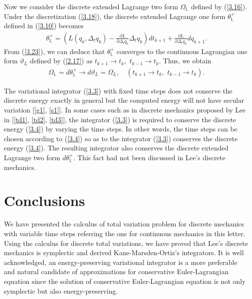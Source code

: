 \documentclass[a4paper,a4paper]{article}
\def\sect#1{\section{#1}\setcounter{equation}{0}}
\begin{document}
Now we consider the discrete extended Lagrange two form
$\Omega_{\mathbb{L}}$ defined by (\ref{3.16}). Under the
discretization (\ref{3.18}), the discrete extended Lagrange one
form $\theta_{\mathbb{L}}^{+}$ defined in (\ref{3.10}) becomes
\begin{align}
\theta_{\mathbb{L}}^{+}=\left(L(q_{k}, \Delta_{t}q_{k})
-\frac{\partial L}{\partial \Delta_{t}q_{k}}
           \Delta_{t}q_{k}\right)dt_{k+1} +
        \frac{\partial L}{\partial \Delta_{t}q_{k} }dq_{k+1}. \label{3.23}
\end{align}
From (\ref{3.23}), we can deduce that $\theta_{\mathbb{L}}^{+}$
converges to the continuous Lagrangian one form $\vartheta_{L}$
defined by (\ref{2.17}) as $t_{k+1}\to t_{k}, \,\,t_{k-1}\to
t_{k}$. Thus, we obtain
\begin{align}
  \Omega_{\mathbb{L}}=d\theta_{\mathbb{L}}^{+}\to d\vartheta_{L}=\Omega_{L},\quad
 (t_{k+1}\to t_{k}, \,\,t_{k-1}\to t_{k}). \label{3.24}
\end{align}

The variational integrator (\ref{3.3}) with fixed time steps does
not conserve the discrete energy exactly in general but the
computed energy will not have secular variation [\ref{g1},
\ref{s1}]. In some cases such as in discrete mechanics proposed by
Lee in
[\ref{td1}, \ref{td2}, \ref{td3}], %
the integrator (\ref{3.3}) is required to conserve the discrete
energy (\ref{3.4}) by varying the time steps. In other words, the
time steps can be chosen according to (\ref{3.4}) so as to the
integrator (\ref{3.3}) conserves the discrete energy (\ref{3.4}).
The resulting
integrator also conserves the discrete extended Lagrange two form
$d\theta_{\mathbb{L}}^{+}$.
 This fact had not been
discussed in Lee's discrete mechanics.





\sect{Conclusions}

We have presented the calculus of total variation problem
for discrete mechanics with variable time steps referring the one
for continuous mechanics
 in this letter.
Using the calculus for discrete total  variations, we have proved
that Lee's discrete mechanics is symplectic and derived
Kane-Marsden-Ortiz's integrators. It is well acknowledged, an
energy-preserving variational integrator is a more preferable and
natural candidate of approximations for conservative
Euler-Lagrangian equation since the solution of conservative
Euler-Lagrangian equation is not only symplectic but also
energy-preserving.
\end{document}
